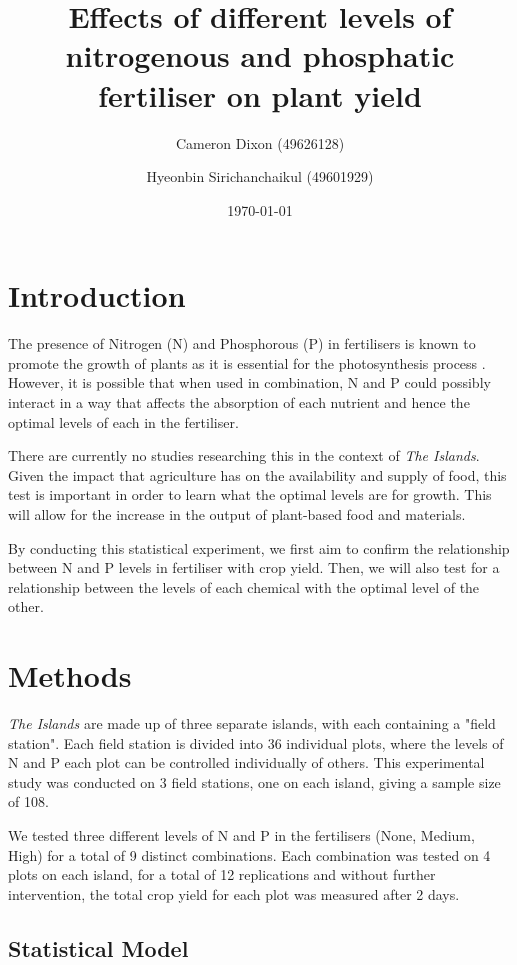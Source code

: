 \documentclass[12pt]{article}
\title{Effects of different levels of nitrogenous and phosphatic fertiliser on plant yield}
\author{Cameron Dixon (49626128)}
\author{Hyeonbin Sirichanchaikul (49601929)}
\affil{The University of Queensland}
\date{\today}
\begin{document}
\maketitle

\section{Introduction}

The presence of Nitrogen (N) and Phosphorous (P) in fertilisers is known to promote the growth of plants as it is essential for the photosynthesis process \parencite{LI2019e00663}. 
However, it is possible that when used in combination, N and P could possibly interact in a way that affects the absorption of each nutrient and hence the optimal levels of each in the fertiliser.

There are currently no studies researching this in the context of \textit{The Islands}.
Given the impact that agriculture has on the availability and supply of food, this test is important in order to learn what the optimal levels are for growth. This will allow for the increase in the output of plant-based food and materials.

By conducting this statistical experiment, we first aim to confirm the relationship between N and P levels in fertiliser with crop yield.
Then, we will also test for a relationship between the levels of each chemical with the optimal level of the other.

\section{Methods}

\textit{The Islands} are made up of three separate islands, with each containing a "field station".
Each field station is divided into 36 individual plots, where the levels of N and P each plot can be controlled individually of others.
This experimental study was conducted on 3 field stations, one on each island, giving a sample size of 108.

We tested three different levels of N and P in the fertilisers (None, Medium, High) for a total of 9 distinct combinations.
Each combination was tested on 4 plots on each island, for a total of 12 replications and without further intervention, the total crop yield for each plot was measured after 2 days.

\subsection{Statistical Model}
\end{document}
